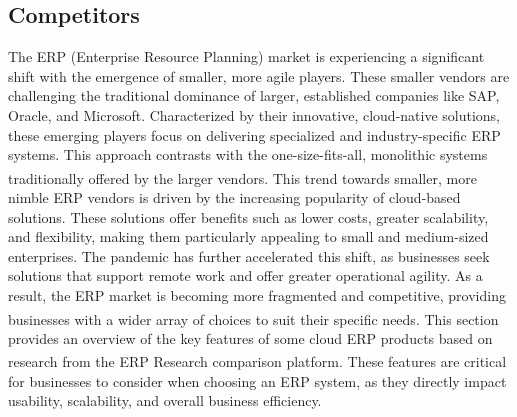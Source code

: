 \subsection{Competitors}
The ERP (Enterprise Resource Planning) market is experiencing a significant shift with the emergence
of smaller, more agile players. These smaller vendors are challenging the traditional dominance of
larger, established companies like SAP, Oracle, and Microsoft. Characterized by their innovative,
cloud-native solutions, these emerging players focus on delivering specialized and industry-specific
ERP systems. This approach contrasts with the one-size-fits-all, monolithic systems traditionally
offered by the larger vendors\textsuperscript{\cite{erp_competitor_1}}.
\newline\newline
This trend towards smaller, more nimble ERP vendors is driven by the increasing popularity of
cloud-based solutions. These solutions offer benefits such as lower costs, greater scalability, and
flexibility, making them particularly appealing to small and medium-sized enterprises. The pandemic
has further accelerated this shift, as businesses seek solutions that support remote work and offer
greater operational agility. As a result, the ERP market is becoming more fragmented and
competitive, providing businesses with a wider array of choices to suit their specific
needs\textsuperscript{\cite{erp_competitor_2}}.
\newline\newline
This section provides an overview of the key features of some cloud ERP products based on research
from the ERP Research comparison platform\textsuperscript{\cite{erp_research}}. These features are
critical for businesses to consider when choosing an ERP system, as they directly impact usability,
scalability, and overall business efficiency.


